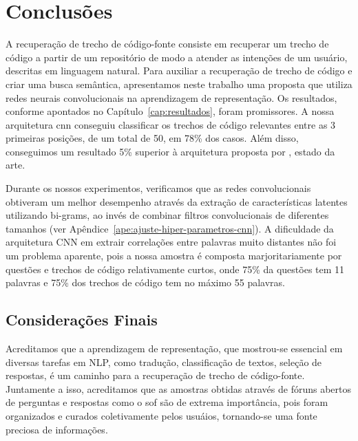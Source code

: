 \chapter{Conclusões}
\label{cap:conclusoes}


A recuperação de trecho de código-fonte consiste em recuperar um trecho de código a partir de um repositório de modo a atender as intenções de um usuário, descritas em linguagem natural. Para auxiliar a recuperação de trecho de código e criar uma busca semântica, apresentamos neste trabalho uma proposta que utiliza redes neurais convolucionais na aprendizagem de representação. Os resultados, conforme apontados no Capítulo~\ref{cap:resultados}, foram promissores. A nossa arquitetura \acrshort{cnn} conseguiu classificar os trechos de código relevantes entre as 3 primeiras posições, de um total de 50, em 78\% dos casos. Além disso, conseguimos um resultado 5\% superior à arquitetura proposta por , estado da arte.

Durante os nossos experimentos, verificamos que as redes convolucionais obtiveram um melhor desempenho através da extração de características latentes utilizando bi-grams, ao invés de combinar filtros convolucionais de diferentes tamanhos (ver Apêndice~\ref{ape:ajuste-hiper-parametros-cnn}). A dificuldade da arquitetura CNN em extrair correlações entre palavras muito distantes não foi um problema aparente, pois a nossa amostra é composta marjoritariamente por questões e trechos de código relativamente curtos, onde 75\% da questões tem 11 palavras e 75\% dos trechos de código tem no máximo 55 palavras. 


\section{Considerações Finais} 
\label{sec:consideracoes-finais}

Acreditamos que a aprendizagem de representação, que mostrou-se essencial em diversas tarefas em NLP, como tradução, classificação de textos, seleção de respostas, é um caminho para a recuperação de trecho de código-fonte. Juntamente a isso, acreditamos que as amostras obtidas através de fóruns abertos de perguntas e respostas como o \Gls{sof} são de extrema importância, pois foram organizados e curados coletivamente pelos usuáios, tornando-se uma fonte preciosa de informações.

